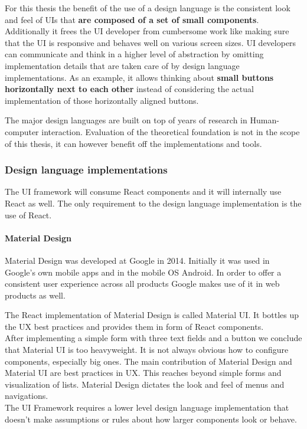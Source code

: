 For this thesis the benefit of the use of a design language is the consistent look and feel of UIs that \textbf{are composed of a set of small components}. Additionally it frees the UI developer from cumbersome work like making sure that the UI is responsive and behaves well on various screen sizes. UI developers can communicate and think in a higher level of abstraction by omitting implementation details that are taken care of by design language implementations. As an example, it allows thinking about \textbf{small buttons horizontally next to each other} instead of considering the actual implementation of those horizontally aligned buttons.

The major design languages are built on top of years of research in Human-computer interaction. Evaluation of the theoretical foundation is not in the scope of this thesis, it can however benefit off the implementations and tools.

\subsubsection{Design language implementations}
The UI framework will consume React components and it will internally use React as well. The only requirement to the design language implementation is the use of React.

\paragraph{Material Design}
Material Design was developed at Google in 2014. Initially it was used in Google's own mobile apps and in the mobile OS Android. In order to offer a consistent user experience across all products Google makes use of it in web products as well.

The React implementation of Material Design is called Material UI. It bottles up the UX best practices and provides them in form of React components. \\ After implementing a simple form with three text fields and a button we conclude that Material UI is too heavyweight. It is not always obvious how to configure components, especially big ones. The main contribution of Material Design and Material UI are best practices in UX. This reaches beyond simple forms and visualization of lists. Material Design dictates the look and feel of menus and navigations. \\ The UI Framework requires a lower level design language implementation that doesn't make assumptions or rules about how larger components look or behave.


